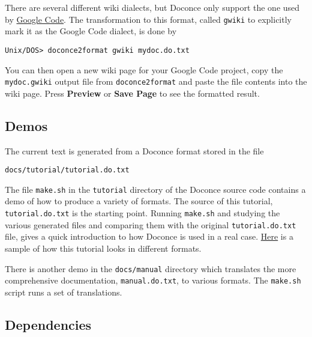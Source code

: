 \documentclass{article}
\begin{document}
There are several different wiki dialects, but Doconce only support the
one used by \href{http://code.google.com/p/support/wiki/WikiSyntax}{Google Code}.
The transformation to this format, called {\fontsize{10pt}{10pt}\verb!gwiki!} to explicitly mark
it as the Google Code dialect, is done by
\begin{Verbatim}[fontsize=\fontsize{9pt}{9pt},tabsize=8,baselinestretch=0.85,
fontfamily=tt,xleftmargin=7mm]
Unix/DOS> doconce2format gwiki mydoc.do.txt
\end{Verbatim}
\noindent
You can then open a new wiki page for your Google Code project, copy
the {\fontsize{10pt}{10pt}\verb!mydoc.gwiki!} output file from {\fontsize{10pt}{10pt}\verb!doconce2format!} and paste the
file contents into the wiki page. Press \textbf{Preview} or \textbf{Save Page} to
see the formatted result.

\subsection{Demos}

The current text is generated from a Doconce format stored in the file
\begin{Verbatim}[fontsize=\fontsize{9pt}{9pt},tabsize=8,baselinestretch=0.85,
fontfamily=tt,xleftmargin=7mm]
docs/tutorial/tutorial.do.txt
\end{Verbatim}
\noindent
The file {\fontsize{10pt}{10pt}\verb!make.sh!} in the {\fontsize{10pt}{10pt}\verb!tutorial!} directory of the
Doconce source code contains a demo of how to produce a variety of
formats.  The source of this tutorial, {\fontsize{10pt}{10pt}\verb!tutorial.do.txt!} is the
starting point.  Running {\fontsize{10pt}{10pt}\verb!make.sh!} and studying the various generated
files and comparing them with the original {\fontsize{10pt}{10pt}\verb!tutorial.do.txt!} file,
gives a quick introduction to how Doconce is used in a real case.
\href{https://doconce.googlecode.com/hg/trunk/docs/demos/tutorial/index.html}{Here} 
is a sample of how this tutorial looks in different formats.

There is another demo in the {\fontsize{10pt}{10pt}\verb!docs/manual!} directory which
translates the more comprehensive documentation, {\fontsize{10pt}{10pt}\verb!manual.do.txt!}, to
various formats. The {\fontsize{10pt}{10pt}\verb!make.sh!} script runs a set of translations.

\subsection{Dependencies}
\end{document}

